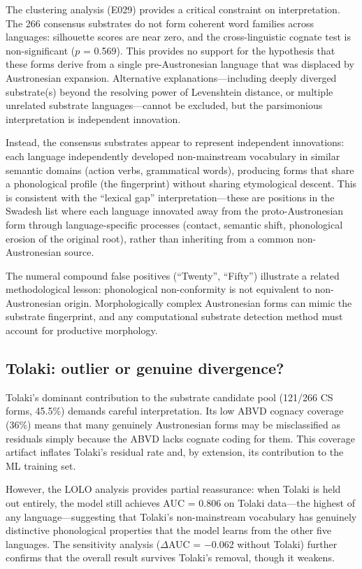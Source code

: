 \documentclass[12pt]{article}
\begin{document}
The clustering analysis (E029) provides a critical constraint on interpretation.
The 266 consensus substrates do not form coherent word families across languages: silhouette scores are near zero, and the cross-linguistic cognate test is non-significant ($p$ = 0.569).
This provides no support for the hypothesis that these forms derive from a single pre-Austronesian language that was displaced by Austronesian expansion.
Alternative explanations---including deeply diverged substrate(s) beyond the resolving power of Levenshtein distance, or multiple unrelated substrate languages---cannot be excluded, but the parsimonious interpretation is independent innovation.

Instead, the consensus substrates appear to represent independent innovations: each language independently developed non-mainstream vocabulary in similar semantic domains (action verbs, grammatical words), producing forms that share a phonological profile (the fingerprint) without sharing etymological descent.
This is consistent with the ``lexical gap'' interpretation---these are positions in the Swadesh list where each language innovated away from the proto-Austronesian form through language-specific processes (contact, semantic shift, phonological erosion of the original root), rather than inheriting from a common non-Austronesian source.

The numeral compound false positives (``Twenty'', ``Fifty'') illustrate a related methodological lesson: phonological non-conformity is not equivalent to non-Austronesian origin.
Morphologically complex Austronesian forms can mimic the substrate fingerprint, and any computational substrate detection method must account for productive morphology.

\subsection{Tolaki: outlier or genuine divergence?}

Tolaki's dominant contribution to the substrate candidate pool (121/266 CS forms, 45.5\%) demands careful interpretation.
Its low ABVD cognacy coverage (36\%) means that many genuinely Austronesian forms may be misclassified as residuals simply because the ABVD lacks cognate coding for them.
This coverage artifact inflates Tolaki's residual rate and, by extension, its contribution to the ML training set.

However, the LOLO analysis provides partial reassurance: when Tolaki is held out entirely, the model still achieves AUC = 0.806 on Tolaki data---the highest of any language---suggesting that Tolaki's non-mainstream vocabulary has genuinely distinctive phonological properties that the model learns from the other five languages.
The sensitivity analysis ($\Delta$AUC = $-$0.062 without Tolaki) further confirms that the overall result survives Tolaki's removal, though it weakens.
\end{document}
